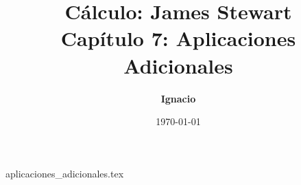 \documentclass[11pt,spanish,oneside]{report}
\title{\textbf{Cálculo: James Stewart} \\ \Large Capítulo 7: Aplicaciones Adicionales}
\author{\textbf{Ignacio}}
\date{\today}
\begin{document}
\maketitle

{aplicaciones_adicionales.tex}
\end{document}
